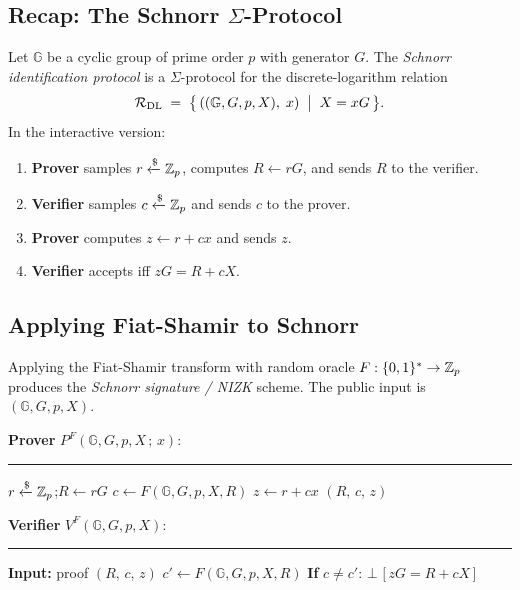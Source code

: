 \documentclass[11pt]{article}
\begin{document}
\subsection{Recap: The Schnorr $\Sigma$-Protocol}

Let $\mathbb{G}$ be a cyclic group of prime order $p$ with generator
$G$.  The \emph{Schnorr identification protocol} is a $\Sigma$-protocol
for the discrete-logarithm relation
\[
  \mathcal{R}_{\mathrm{DL}} \;=\;
  \bigl\{\,((\mathbb{G},G,p,X),\; x) \;\bigm|\;
          X = xG\,\bigr\}.
\]
In the interactive version:
\begin{enumerate}
  \item \textbf{Prover} samples $r \xleftarrow{\$} \mathbb{Z}_p$, computes
        $R \leftarrow rG$, and sends $R$ to the verifier.
  \item \textbf{Verifier} samples $c \xleftarrow{\$} \mathbb{Z}_p$ and sends
        $c$ to the prover.
  \item \textbf{Prover} computes $z \leftarrow r + cx$ and sends $z$.
  \item \textbf{Verifier} accepts iff $zG = R + cX$.
\end{enumerate}

\subsection{Applying Fiat-Shamir to Schnorr}

Applying the Fiat-Shamir transform with random oracle
$F : \{0,1\}^* \to \mathbb{Z}_p$ produces the \emph{Schnorr signature / NIZK}
scheme.  The public input is $(\mathbb{G}, G, p, X)$.

\begin{tcolorbox}[colback=blue!5, colframe=blue!40!black,
                  title={Fiat-Shamir Schnorr: Non-Interactive Proof}]

\begin{minipage}[t]{0.46\textwidth}
\textbf{Prover} $P^F(\mathbb{G},G,p,X\,;\,x)$:
\medskip\hrule\medskip
\begin{algorithmic}[1]
  \State $r \xleftarrow{\$} \mathbb{Z}_p$;\quad $R \leftarrow rG$
  \State $c \leftarrow F(\mathbb{G},G,p,X,R)$
  \State $z \leftarrow r + cx$
  \State \Return $(R,\, c,\, z)$
\end{algorithmic}
\end{minipage}
\hfill
\begin{minipage}[t]{0.46\textwidth}
\textbf{Verifier} $V^F(\mathbb{G},G,p,X)$:
\medskip\hrule\medskip
\begin{algorithmic}[1]
  \State \textbf{Input:} proof $(R,\, c,\, z)$
  \State $c' \leftarrow F(\mathbb{G},G,p,X,R)$
  \State \textbf{If} $c \neq c'$: \Return $\bot$
  \State \Return $\bigl[\,zG = R + cX\,\bigr]$
\end{algorithmic}
\end{minipage}

\end{tcolorbox}
\end{document}
